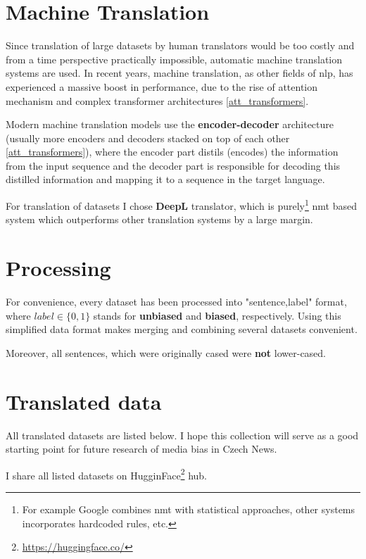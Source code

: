  
 
 
 
\section{Machine Translation}\label{DeepL}
Since translation of large datasets by human translators would be too costly and from a time perspective practically impossible, automatic machine translation systems are used. In recent years, machine translation, as other fields of \Gls{nlp}, has experienced a massive boost in performance, due to the rise of attention mechanism and complex transformer architectures \ref{att_transformers}.

Modern machine translation models use the \textbf{encoder-decoder} architecture (usually more encoders and decoders stacked on top of each other \ref{att_transformers}), where the encoder part distils (encodes) the information from the input sequence and the decoder part is responsible for decoding this distilled information and mapping it to a sequence in the target language.

For translation of datasets I chose \textbf{DeepL} translator, which is purely\footnote{For example Google combines \Gls{nmt} with statistical approaches, other systems incorporates hardcoded rules, etc.} \Gls{nmt} based system which outperforms other translation systems by a large margin.






\section{Processing}\label{processing}
For convenience, every dataset has been processed into "sentence,label" format, where $label \in \{0,1\}$ stands for \textbf{unbiased} and \textbf{biased}, respectively. Using this simplified data format makes merging and combining several datasets convenient.
    
Moreover, all sentences, which were originally cased were \textbf{not} lower-cased.

\newpage
\section{Translated data}
All translated datasets are listed below. I hope this collection will serve as a good starting point for future research of media bias in Czech News.

I share all listed datasets on HugginFace\footnote{\url{https://huggingface.co/}} hub.

